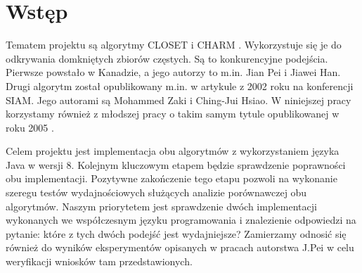 \section{Wstęp}

Tematem projektu są algorytmy CLOSET \cite{closetArt} i CHARM \cite{charmArt}. Wykorzystuje się je do odkrywania domkniętych zbiorów częstych.
Są to konkurencyjne podejścia. Pierwsze powstało w Kanadzie, a jego autorzy to m.in. Jian Pei i Jiawei Han. Drugi algorytm został opublikowany m.in. w artykule z 2002 roku na konferencji SIAM. Jego autorami są Mohammed Zaki i Ching-Jui Hsiao. W niniejszej pracy korzystamy również z młodszej pracy o takim samym tytule opublikowanej w roku 2005 \cite{charmArt}.

Celem projektu jest implementacja obu algorytmów z wykorzystaniem języka Java w wersji 8.
Kolejnym kluczowym etapem będzie sprawdzenie poprawności obu implementacji.
Pozytywne zakończenie tego etapu pozwoli na wykonanie szeregu testów wydajnościowych służących analizie porównawczej obu algorytmów.
Naszym priorytetem jest sprawdzenie dwóch implementacji wykonanych we współczesnym języku programowania i znalezienie odpowiedzi na pytanie: które z tych dwóch podejść jest wydajniejsze?
Zamierzamy odnosić się również do wyników eksperymentów opisanych w pracach autorstwa J.Pei \cite{closetArt} w celu weryfikacji wniosków tam przedstawionych.
